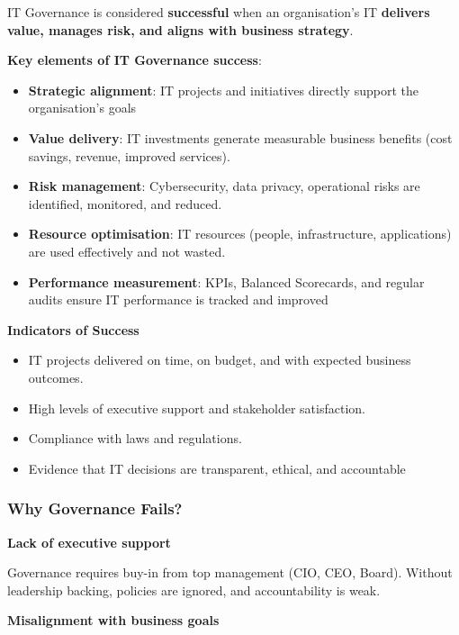 \indent 

IT Governance is considered \textbf{successful} when an organisation’s IT \textbf{delivers value, manages risk, and aligns with business strategy}.

\noindent\textbf{Key elements of IT Governance success}:

\begin{itemize}
    \item \textbf{Strategic alignment}: IT projects and initiatives directly support the organisation’s goals
    \item \textbf{Value delivery}: IT investments generate measurable business benefits (cost savings, revenue, improved services).
    \item \textbf{Risk management}: Cybersecurity, data privacy, operational risks are identified, monitored, and reduced.
    \item \textbf{Resource optimisation}: IT resources (people, infrastructure, applications) are used effectively and not wasted.
    \item \textbf{Performance measurement}: KPIs, Balanced Scorecards, and regular audits ensure IT performance is tracked and improved
\end{itemize}

\noindent\textbf{Indicators of Success}

\begin{itemize}
    \item IT projects delivered on time, on budget, and with expected business outcomes.
    \item High levels of executive support and stakeholder satisfaction.
    \item Compliance with laws and regulations.
    \item Evidence that IT decisions are transparent, ethical, and accountable
\end{itemize}

\subsubsection{Why Governance Fails?}

\noindent\textbf{Lack of executive support}

Governance requires buy-in from top management (CIO, CEO, Board). Without leadership backing, policies are ignored, and accountability is weak.

\noindent\textbf{Misalignment with business goals}

